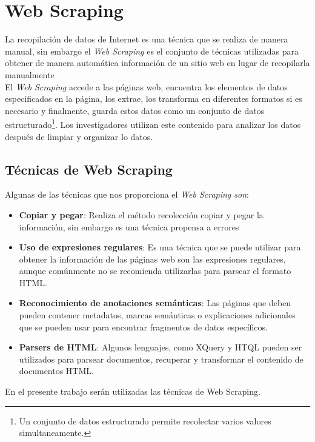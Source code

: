 

\section{Web Scraping}
La recopilación de datos de Internet es una técnica que se realiza de manera manual, sin embargo 
el \textit{Web Scraping} es el conjunto de técnicas utilizadas para obtener de manera automática información de 
un sitio web en lugar de recopilarla manualmente %
\\
El \textit{Web Scraping} accede a las páginas web, encuentra los elementos de datos especificados en la 
página, los extrae, los transforma en diferentes formatos si es necesario y finalmente, guarda 
estos datos como un conjunto de datos estructurado\footnote{Un conjunto de datos estructurado permite recolectar 
varios valores simultaneamente.}. Los investigadores utilizan este contenido para analizar los datos 
después de limpiar y organizar lo datos.
\subsection{Técnicas de Web Scraping}

Algunas de las técnicas que nos proporciona el \textit{Web Scraping son}:
\begin{itemize}
    \item \textbf{Copiar y pegar}: Realiza el método recolección copiar y pegar la información, 
    sin embargo es una técnica propensa a errores
    \item \textbf{Uso de expresiones regulares}: Es una técnica que se puede utilizar para obtener la información 
    de las páginas web son las expresiones regulares, aunque comúnmente no se recomienda utilizarlas para parsear el formato HTML.
    \item \textbf{Reconocimiento de anotaciones semánticas}: Las páginas que deben pueden contener metadatos, 
    marcas semánticas o explicaciones adicionales que se pueden usar para encontrar fragmentos de datos específicos.
    \item \textbf{Parsers de HTML}: Algunos lenguajes, como XQuery y HTQL pueden ser utilizados para parsear documentos, recuperar 
    y transformar el contenido de documentos HTML.
\end{itemize}
En el presente trabajo serán utilizadas las técnicas de Web Scraping.

